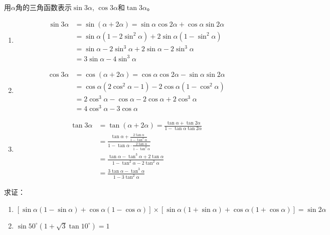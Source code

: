 \begin{example}
用$\alpha$角的三角函数表示$\sin3\alpha$, $\cos3\alpha$和$\tan3\alpha$。
\end{example}



\begin{solution}
\begin{enumerate}
    \item \[\begin{split}
        \sin3\alpha&=\sin(\alpha+2\alpha)=\sin\alpha \cos2\alpha+\cos\alpha\sin2\alpha\\
        &=\sin\alpha(1-2\sin^2\alpha)+2\sin\alpha(1-\sin^2\alpha) \\
        &=\sin\alpha-2\sin^3\alpha+2\sin\alpha-2\sin^3\alpha\\
        &=3\sin\alpha-4\sin^3\alpha     
    \end{split}\]
    \item \[\begin{split}
       \cos3\alpha&=\cos(\alpha+2\alpha)=\cos\alpha\cos2\alpha-\sin\alpha\sin2\alpha\\
       &=\cos\alpha(2\cos^2\alpha-1)-2\cos\alpha(1-\cos^2\alpha)\\
       &=2\cos^3\alpha-\cos\alpha-2\cos\alpha+2\cos^3\alpha\\
       &=4\cos^3\alpha-3\cos\alpha 
    \end{split}\]
    \item \[\begin{split}
\tan3\alpha&=\tan(\alpha+2\alpha)=\frac{\tan\alpha+\tan2\alpha}{1-\tan\alpha\tan2\alpha}\\
&=\frac{\tan\alpha+\frac{2\tan\alpha}{1-\tan^2\alpha}}{1-\tan\alpha\cdot \frac{2\tan\alpha}{1-\tan^2\alpha}}\\
&=\frac{\tan\alpha-\tan^3\alpha+2\tan\alpha}{1-\tan^2\alpha-2\tan^2\alpha}\\
&=\frac{3\tan\alpha-\tan^3\alpha}{1-3\tan^2\alpha}        
    \end{split}\]
\end{enumerate}
\end{solution}

\begin{example}
求证：
\begin{enumerate}
    \item $[\sin\alpha(1-\sin\alpha)+\cos\alpha(1-\cos\alpha)]\times [\sin\alpha(1+\sin\alpha)+\cos\alpha(1+\cos\alpha)]=\sin2\alpha$
    \item $\sin 50^{\circ}\left(1+\sqrt{3}\tan 10^{\circ}\right)=1$
\end{enumerate}
\end{example}

